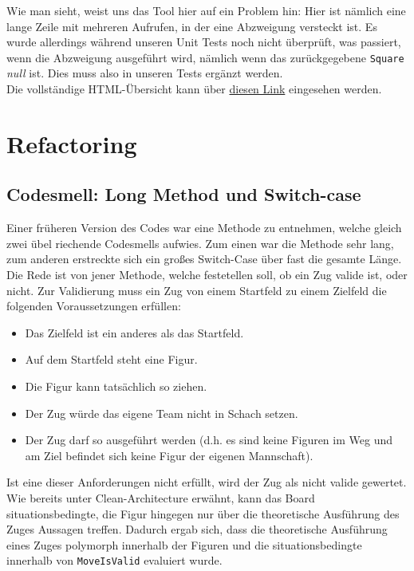 \documentclass[
10pt, %
a4paper, %
oneside, %
headinclude,footinclude, %
BCOR5mm, %
]{scrartcl}
\begin{document}
\begin{onehalfspace}
Wie man sieht, weist uns das Tool hier auf ein Problem hin: Hier ist nämlich eine lange Zeile mit mehreren Aufrufen, in der eine Abzweigung versteckt ist. Es wurde allerdings während unseren Unit Tests noch nicht überprüft, was passiert, wenn die Abzweigung ausgeführt wird, nämlich wenn das zurückgegebene \texttt{Square} \textsl{null} ist. Dies muss also in unseren Tests ergänzt werden.
\\
Die vollständige HTML-Übersicht kann über \href{https://github.com/schmida736/Chess-AdvancedSE/tree/main/Chess-AdvancedSE.Tests/coverage%20results}{diesen Link} eingesehen werden.

\newpage
\section{Refactoring}
\subsection{Codesmell: Long Method und Switch-case}
Einer früheren Version des Codes war eine Methode zu entnehmen, welche gleich zwei übel riechende Codesmells aufwies. Zum einen war die Methode sehr lang, zum anderen erstreckte sich ein großes Switch-Case über fast die gesamte Länge. Die Rede ist von jener Methode, welche festetellen soll, ob ein Zug valide ist, oder nicht. Zur Validierung muss ein Zug von einem Startfeld zu einem Zielfeld die folgenden Voraussetzungen erfüllen:
\begin{center}
	\begin{itemize}
		\item Das Zielfeld ist ein anderes als das Startfeld.
		\item Auf dem Startfeld steht eine Figur.
		\item Die Figur kann tatsächlich so ziehen.
		\item Der Zug würde das eigene Team nicht in Schach setzen.
		\item Der Zug darf so ausgeführt werden (d.h. es sind keine Figuren im Weg und am Ziel befindet sich keine Figur der eigenen Mannschaft).
	\end{itemize}
\end{center}
Ist eine dieser Anforderungen nicht erfüllt, wird der Zug als nicht valide gewertet. Wie bereits unter Clean-Architecture erwähnt, kann das Board situationsbedingte, die Figur hingegen nur über die theoretische Ausführung des Zuges Aussagen treffen. Dadurch ergab sich, dass die theoretische Ausführung eines Zuges polymorph innerhalb der Figuren und die situationsbedingte innerhalb von \texttt{MoveIsValid} evaluiert wurde. 
\vspace{0.5cm}


\end{onehalfspace}
\end{document}
